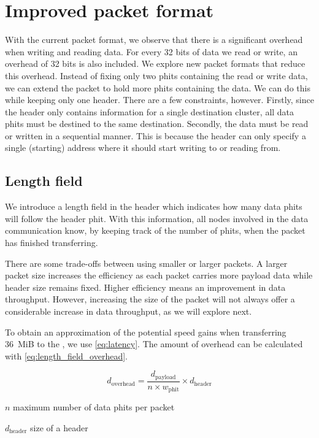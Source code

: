\section{Improved packet format}
\label{section:improved_packet_format}
With the current packet format, we observe that there is a significant overhead when writing and reading data.
For every 32 bits of data we read or write, an overhead of 32 bits is also included.
We explore new packet formats that reduce this overhead.
Instead of fixing only two phits containing the read or write data, we can extend the packet to hold more phits containing the data.
We can do this while keeping only one header.
There are a few constraints, however.
Firstly, since the header only contains information for a single destination cluster, all data phits must be destined to the same destination.
Secondly, the data must be read or written in a sequential manner.
This is because the header can only specify a single (starting) address where it should start writing to or reading from.

\subsection{Length field}
We introduce a length field in the header which indicates how many data phits will follow the header phit.
With this information, all nodes involved in the data communication know, by keeping track of the number of phits, when the packet has finished transferring. 

There are some trade-offs between using smaller or larger packets.
A larger packet size increases the efficiency as each packet carries more payload data while header size remains fixed.
Higher efficiency means an improvement in data throughput.
However, increasing the size of the packet will not always offer a considerable increase in data throughput, as we will explore next.

To obtain an approximation of the potential speed gains when transferring \SI{36}{MiB} to the \graicore{}, we use \cref{eq:latency}.
The amount of overhead can be calculated with \cref{eq:length_field_overhead}.

\begin{equation}
    d_{\textrm{overhead}} = \frac{d_{\textrm{payload}}}{n \times w_\textrm{phit}} \times d_\textrm{header}
\label{eq:length_field_overhead}
\end{equation}

\begin{eqexpl}[15mm]
    \item{$n$} maximum number of data phits per packet
    \item{$d_{\text{header}}$} size of a header
\end{eqexpl}

